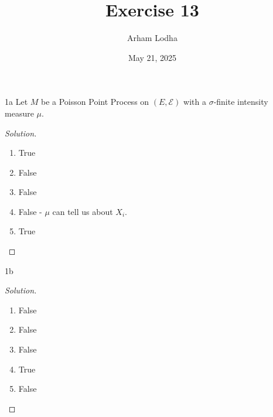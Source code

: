 \documentclass{article}
\newcommand{\Ec}[0]{\mathcal{E}}
\newenvironment{solution}
{\renewcommand\qedsymbol{$\blacksquare$}\begin{proof}[Solution]}
{\end{proof}}
\begin{document}
\title{Exercise 13}
\author{Arham Lodha}%
\date{May 21, 2025}%
\maketitle

\begin{PROB}{1a}\label{Problem 1a.}
    Let $M$ be a Poisson Point Process on $(E, \Ec)$ with a $\sigma$-finite intensity measure $\mu$.    
\end{PROB}
\begin{solution}
    \begin{enumerate}
        \item True
        \item False
        \item False
        \item False - $\mu$ can tell us about $X_i$. 
        \item True
    \end{enumerate}
    
\end{solution}
\begin{PROB}{1b}\label{Problem 1b.}
    
\end{PROB}
\begin{solution}
    \begin{enumerate}
        \item False
        \item False
        \item False
        \item True
        \item False
    \end{enumerate}
\end{solution}

\bigskip
\end{document}
